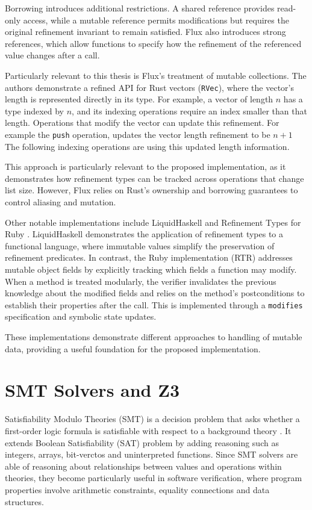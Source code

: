 Borrowing introduces additional restrictions. A shared reference provides
read-only access, while a mutable reference permits modifications but
requires the original refinement invariant to remain satisfied. Flux also
introduces strong references, which allow functions to specify how the
refinement of the referenced value changes after a call.

Particularly relevant to this thesis is Flux's treatment of mutable
collections. The authors demonstrate a refined API for Rust vectors
(\texttt{RVec}), where the vector's length is represented directly in its
type. For example, a vector of length \(n\) has a type indexed by \(n\),
and its indexing operations require an index smaller than that
length. Operations that modify the vector can update this refinement.
For example the \texttt{push} operation, updates the vector length refinement to be \(n + 1\)
The following indexing operations are using this updated length information.

This approach is particularly relevant to the proposed implementation,
as it demonstrates how refinement types can be tracked across
operations that change list size. However, Flux relies on Rust's
ownership and borrowing guarantees to control aliasing and mutation.

Other notable implementations include LiquidHaskell
\cite{vazouLiquidHaskellExperienceRefinement2014} and Refinement Types
for Ruby \cite{kazerounianRefinementTypesRuby2017}. LiquidHaskell
demonstrates the application of refinement types to a functional language,
where immutable values simplify the preservation of
refinement predicates. In contrast, the Ruby implementation (RTR) addresses
mutable object fields by explicitly tracking which fields a function may
modify. When a method is treated modularly, the verifier invalidates
the previous knowledge about the modified fields and relies on the
method's postconditions to establish their properties after the call.
This is implemented through a \texttt{modifies} specification and
symbolic state updates.

These implementations demonstrate different approaches to handling
of mutable data, providing a useful foundation for the proposed implementation.


\section{SMT Solvers and Z3}
\label{sec:smt_solvers}
Satisfiability Modulo Theories (SMT) is a decision problem that asks whether a first-order logic
formula is satisfiable with respect to a background theory \cite{barrettChapter33Satisfiability2021}. It extends Boolean Satisfiability (SAT) problem
by adding reasoning such as integers, arrays, bit-verctos and uninterpreted functions. Since SMT solvers
are able of reasoning about relationships between values and operations within theories, they become
particularly useful in software verification, where program properties involve arithmetic constraints, equality connections
and data structures.

